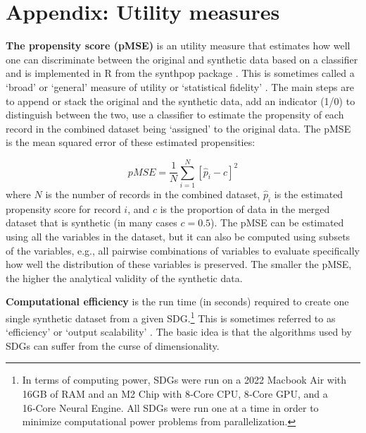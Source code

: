 \documentclass[runningheads]{llncs}
\begin{document}




\appendix
\section{Appendix: Utility measures}\label{appendix:utility_measures}
\setcounter{figure}{0}    
\setcounter{table}{0}    

{\bf The propensity score (pMSE)}  is an utility measure that estimates how well one can discriminate between the original and synthetic data based on a classifier \cite{woo2009global,snoke2018general} and is implemented in \textsf{R} from the synthpop package \cite{nowok2016synthpop}.  This is sometimes called a `broad'\cite{snoke2018general} or `general'\cite{drechsler2009disclosure} measure of utility or `statistical fidelity' \cite{jordon2022synthetic}.  The main steps are to append or stack the original and the synthetic data, add an indicator (1/0) to distinguish between the two, use a classifier to estimate the propensity of each record in the combined dataset being `assigned' to the original data. The pMSE is the mean squared error of these estimated propensities:

\begin{equation}
pMSE = \frac{1}{N}\sum_{i=1}^{N}[\hat{p}_i - c]^2
\end{equation}
where $N$ is the number of records in the combined dataset, $\hat{p}_i$ is the estimated propensity score for record $i$, and $c$ is the proportion of data in the merged dataset that is synthetic (in many cases $c=0.5$). The pMSE can be estimated using all the variables in the dataset, but it can also be computed using subsets of the variables, e.g., all pairwise combinations of variables to evaluate specifically how well the distribution of these variables is preserved. The smaller the pMSE, the higher the analytical validity of the synthetic data.


{\bf Computational efficiency} is the run time (in seconds) required to create one single synthetic dataset from a given SDG.\footnote{In terms of computing power, SDGs were run on a 2022 Macbook Air with 16GB of RAM and an M2 Chip with 8‑Core CPU, 8‑Core GPU, and a 16‑Core Neural Engine.  All SDGs were run one at a time in order to minimize computational power problems from parallelization.}  This is sometimes referred to as `efficiency'\cite{jordon2022synthetic} or `output scalability' \cite{zhang2017privbayes}.  The basic idea is that the algorithms used by SDGs can suffer from the curse of dimensionality.  
\end{document}
